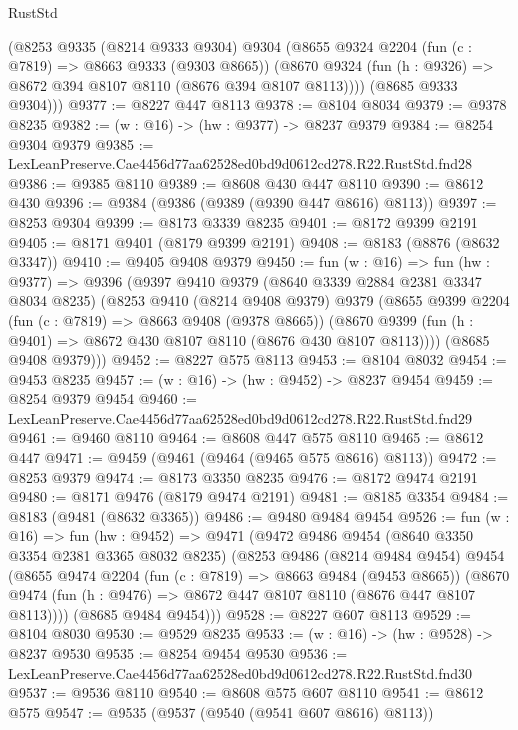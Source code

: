 \begin{lexlean}{RustStd}
\begin{coremodule}
      (@8253
        @9335
        (@8214 @9333 @9304)
        @9304
        (@8655
          @9324
          @2204
          (fun (c : @7819) => @8663 @9333 (@9303 @8665))
          (@8670 @9324 (fun (h : @9326) => @8672 @394 @8107 @8110 (@8676 @394 @8107 @8113))))
        (@8685 @9333 @9304)))
@9377 := @8227 @447 @8113
@9378 := @8104 @8034
@9379 := @9378 @8235
@9382 := (w : @16) -> (hw : @9377) -> @8237 @9379
@9384 := @8254 @9304 @9379
@9385 := LexLeanPreserve.Cae4456d77aa62528ed0bd9d0612cd278.R22.RustStd.fnd28
@9386 := @9385 @8110
@9389 := @8608 @430 @447 @8110
@9390 := @8612 @430
@9396 := @9384 (@9386 (@9389 (@9390 @447 @8616) @8113))
@9397 := @8253 @9304
@9399 := @8173 @3339 @8235
@9401 := @8172 @9399 @2191
@9405 := @8171 @9401 (@8179 @9399 @2191)
@9408 := @8183 (@8876 (@8632 @3347))
@9410 := @9405 @9408 @9379
@9450 := fun (w : @16) =>
  fun (hw : @9377) =>
  @9396
    (@9397
      @9410
      @9379
      (@8640 @3339 @2884 @2381 @3347 @8034 @8235)
      (@8253
        @9410
        (@8214 @9408 @9379)
        @9379
        (@8655
          @9399
          @2204
          (fun (c : @7819) => @8663 @9408 (@9378 @8665))
          (@8670 @9399 (fun (h : @9401) => @8672 @430 @8107 @8110 (@8676 @430 @8107 @8113))))
        (@8685 @9408 @9379)))
@9452 := @8227 @575 @8113
@9453 := @8104 @8032
@9454 := @9453 @8235
@9457 := (w : @16) -> (hw : @9452) -> @8237 @9454
@9459 := @8254 @9379 @9454
@9460 := LexLeanPreserve.Cae4456d77aa62528ed0bd9d0612cd278.R22.RustStd.fnd29
@9461 := @9460 @8110
@9464 := @8608 @447 @575 @8110
@9465 := @8612 @447
@9471 := @9459 (@9461 (@9464 (@9465 @575 @8616) @8113))
@9472 := @8253 @9379
@9474 := @8173 @3350 @8235
@9476 := @8172 @9474 @2191
@9480 := @8171 @9476 (@8179 @9474 @2191)
@9481 := @8185 @3354
@9484 := @8183 (@9481 (@8632 @3365))
@9486 := @9480 @9484 @9454
@9526 := fun (w : @16) =>
  fun (hw : @9452) =>
  @9471
    (@9472
      @9486
      @9454
      (@8640 @3350 @3354 @2381 @3365 @8032 @8235)
      (@8253
        @9486
        (@8214 @9484 @9454)
        @9454
        (@8655
          @9474
          @2204
          (fun (c : @7819) => @8663 @9484 (@9453 @8665))
          (@8670 @9474 (fun (h : @9476) => @8672 @447 @8107 @8110 (@8676 @447 @8107 @8113))))
        (@8685 @9484 @9454)))
@9528 := @8227 @607 @8113
@9529 := @8104 @8030
@9530 := @9529 @8235
@9533 := (w : @16) -> (hw : @9528) -> @8237 @9530
@9535 := @8254 @9454 @9530
@9536 := LexLeanPreserve.Cae4456d77aa62528ed0bd9d0612cd278.R22.RustStd.fnd30
@9537 := @9536 @8110
@9540 := @8608 @575 @607 @8110
@9541 := @8612 @575
@9547 := @9535 (@9537 (@9540 (@9541 @607 @8616) @8113))

\end{coremodule}
\end{lexlean}
